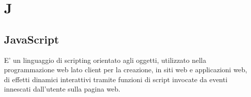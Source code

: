 \section*{J}

\subsection{JavaScript}
E' un linguaggio di scripting orientato agli oggetti, utilizzato nella programmazione web lato client per la creazione, in siti web e applicazioni web, di effetti dinamici interattivi tramite funzioni di script invocate da eventi innescati dall'utente sulla pagina web.